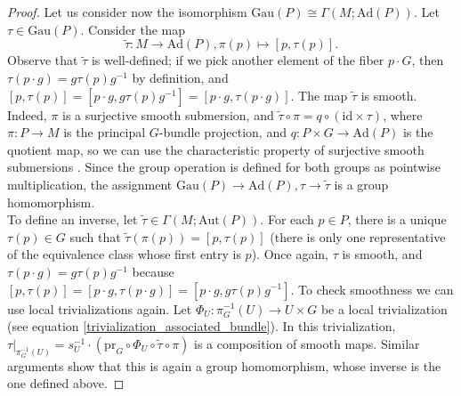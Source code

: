 \begin{proof}
    Let us consider now the isomorphism \(\mathrm{Gau}(P) \cong \Gamma(M;\mathrm{Ad}(P))\). Let \(\tau \in \mathrm{Gau}(P)\). Consider the map
    \[
    \tilde{\tau}\colon M  \longrightarrow  \mathrm{Ad}(P),\pi(p) \mapsto  [p, \tau(p)].
    \]
    Observe that \(\tilde{\tau}\) is well-defined; if we pick another element of the fiber \(p \cdot G\), then \(\tau(p\cdot g)=g\tau(p)g^{-1}\) by definition, and \([p, \tau(p)]=[p\cdot g, g \tau(p)g^{-1}]=[p \cdot g,\tau(p \cdot g)]\). The map \(\tilde{\tau}\) is smooth. Indeed, \(\pi\) is a surjective smooth submersion, and \(\tilde{\tau} \circ \pi=q \circ (\mathrm{id} \times \tau)\), where \(\pi \colon P \to M\) is the principal \(G\)-bundle projection, and \(q\colon P \times G \to \mathrm{Ad}(P)\) is the quotient map, so we can use the  characteristic property of surjective smooth submersions \parencite[Th. 4.29]{lee_introSM}. Since the group operation is defined for both groups as pointwise multiplication, the assignment \(\mathrm{Gau}(P) \to \mathrm{Ad}(P), \tau \to \tilde{\tau}\) is a group homomorphism. \\
    
    To define an inverse, let \(\tilde{\tau} \in \Gamma(M;\mathrm{Aut}(P))\). For each \(p \in P\), there is a unique \(\tau(p) \in G\) such that \(\tilde{\tau}(\pi(p))=[p, \tau(p)]\) (there is only one representative of the equivalence class whose first entry is \(p\)). Once again, \(\tau\) is smooth, and \(\tau(p \cdot g)=g\tau(p)g^{-1}\) because \([p, \tau(p)]=[p \cdot g, \tau(p\cdot g)]=[p \cdot g, g\tau(p)g^{-1}]\). To check smoothness we can use local trivializations again. Let \(\Phi_U\colon \pi_G^{-1}(U) \to U \times G\) be a local trivialization (see equation \ref{trivialization_associated_bundle}). In this trivialization, \(\tau|_{\pi_G^{-1}(U)}=s_U^{-1}\cdot (\mathrm{pr}_G \circ \Phi_U \circ \tilde{\tau} \circ \pi)\) is a composition of smooth maps. Similar arguments show that this is again a group homomorphism, whose inverse is the one defined above.
\end{proof}


